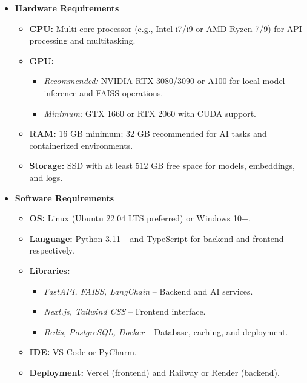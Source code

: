\begin{itemize}
    \item \textbf{Hardware Requirements}
    \begin{itemize}
        \item \textbf{CPU:} Multi-core processor (e.g., Intel i7/i9 or AMD Ryzen 7/9) for API processing and multitasking.
        \item \textbf{GPU:} 
        \begin{itemize}
            \item \textit{Recommended:} NVIDIA RTX 3080/3090 or A100 for local model inference and FAISS operations.
            \item \textit{Minimum:} GTX 1660 or RTX 2060 with CUDA support.
        \end{itemize}
        \item \textbf{RAM:} 16 GB minimum; 32 GB recommended for AI tasks and containerized environments.
        \item \textbf{Storage:} SSD with at least 512 GB free space for models, embeddings, and logs.
    \end{itemize}

    \item \textbf{Software Requirements}
    \begin{itemize}
        \item \textbf{OS:} Linux (Ubuntu 22.04 LTS preferred) or Windows 10+.
        \item \textbf{Language:} Python 3.11+ and TypeScript for backend and frontend respectively.
        \item \textbf{Libraries:}
        \begin{itemize}
            \item \textit{FastAPI, FAISS, LangChain} – Backend and AI services.
            \item \textit{Next.js, Tailwind CSS} – Frontend interface.
            \item \textit{Redis, PostgreSQL, Docker} – Database, caching, and deployment.
        \end{itemize}
        \item \textbf{IDE:} VS Code or PyCharm.
        \item \textbf{Deployment:} Vercel (frontend) and Railway or Render (backend).
    \end{itemize}
\end{itemize}





